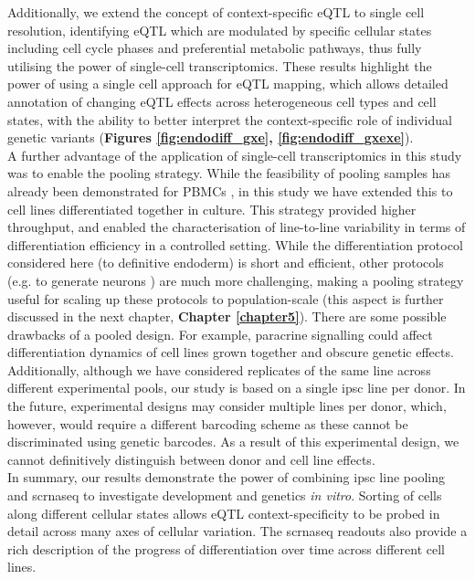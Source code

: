 Additionally, we extend the concept of context-specific eQTL \cite{fairfax2012genetics, fairfax2014innate, knowles2017allele} to single cell resolution, identifying eQTL which are modulated by specific cellular states including cell cycle phases and preferential metabolic pathways, thus fully utilising the power of single-cell transcriptomics.
These results highlight the power of using a single cell approach for eQTL mapping, which allows detailed annotation of changing eQTL effects across heterogeneous cell types and cell states, with the ability to better interpret the context-specific role of individual genetic variants (\textbf{Figures \ref{fig:endodiff_gxe}, \ref{fig:endodiff_gxexe}}). \\

A further advantage of the application of single-cell transcriptomics in this study was to enable the pooling strategy. 
While the feasibility of pooling samples has already been demonstrated for PBMCs \cite{kang2018multiplexed}, in this study we have extended this to cell lines differentiated together in culture. 
This strategy provided higher throughput, and enabled the characterisation of line-to-line variability in terms of differentiation efficiency in a controlled setting. 
While the differentiation protocol considered here (to definitive endoderm) is short and efficient, other protocols (e.g. to generate neurons \cite{tao2016neural}) are much more challenging, making a pooling strategy useful for scaling up these protocols to population-scale (this aspect is further discussed in the next chapter, \textbf{Chapter \ref{chapter5}}).
There are some possible drawbacks of a pooled design. 
For example, paracrine signalling \cite{muller2016distinguishing} could affect differentiation dynamics of cell lines grown together and obscure genetic effects. 
Additionally, although we have considered replicates of the same line across different experimental pools, our study is based on a single \gls{ipsc} line per donor. 
In the future, experimental designs may consider multiple lines per donor, which, however, would require a different barcoding scheme as these cannot be discriminated using genetic barcodes. 
As a result of this experimental design, we cannot definitively distinguish between donor and cell line effects.\\

In summary, our results demonstrate the power of combining \gls{ipsc} line pooling and \gls{scrnaseq} to investigate development and genetics \textit{in vitro}. 
Sorting of cells along different cellular states allows eQTL  context-specificity to be probed in detail across many axes of cellular variation. 
The \gls{scrnaseq} readouts also provide a rich description of the progress of differentiation over time across different cell lines. \\

